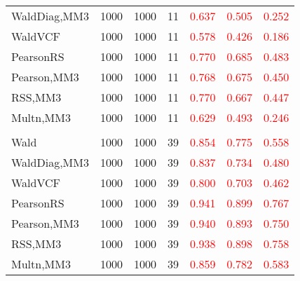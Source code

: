 \documentclass[
]{article}
\begin{document}
\begin{table}[H]
{\begin{tabular}[t]{lrrrrrr}
\hspace{1em}WaldDiag,MM3 & 1000 & 1000 & 11 & \textcolor{red}{0.637} & \textcolor{red}{0.505} & \textcolor{red}{0.252}\\
\hspace{1em}WaldVCF & 1000 & 1000 & 11 & \textcolor{red}{0.578} & \textcolor{red}{0.426} & \textcolor{red}{0.186}\\
\hspace{1em}PearsonRS & 1000 & 1000 & 11 & \textcolor{red}{0.770} & \textcolor{red}{0.685} & \textcolor{red}{0.483}\\
\hspace{1em}Pearson,MM3 & 1000 & 1000 & 11 & \textcolor{red}{0.768} & \textcolor{red}{0.675} & \textcolor{red}{0.450}\\
\hspace{1em}RSS,MM3 & 1000 & 1000 & 11 & \textcolor{red}{0.770} & \textcolor{red}{0.667} & \textcolor{red}{0.447}\\
\hspace{1em}Multn,MM3 & 1000 & 1000 & 11 & \textcolor{red}{0.629} & \textcolor{red}{0.493} & \textcolor{red}{0.246}\\
\addlinespace[0.3em]
\multicolumn{7}{l}{\textbf{3F 15V}}\\
\hspace{1em}Wald & 1000 & 1000 & 39 & \textcolor{red}{0.854} & \textcolor{red}{0.775} & \textcolor{red}{0.558}\\
\hspace{1em}WaldDiag,MM3 & 1000 & 1000 & 39 & \textcolor{red}{0.837} & \textcolor{red}{0.734} & \textcolor{red}{0.480}\\
\hspace{1em}WaldVCF & 1000 & 1000 & 39 & \textcolor{red}{0.800} & \textcolor{red}{0.703} & \textcolor{red}{0.462}\\
\hspace{1em}PearsonRS & 1000 & 1000 & 39 & \textcolor{red}{0.941} & \textcolor{red}{0.899} & \textcolor{red}{0.767}\\
\hspace{1em}Pearson,MM3 & 1000 & 1000 & 39 & \textcolor{red}{0.940} & \textcolor{red}{0.893} & \textcolor{red}{0.750}\\
\hspace{1em}RSS,MM3 & 1000 & 1000 & 39 & \textcolor{red}{0.938} & \textcolor{red}{0.898} & \textcolor{red}{0.758}\\
\hspace{1em}Multn,MM3 & 1000 & 1000 & 39 & \textcolor{red}{0.859} & \textcolor{red}{0.782} & \textcolor{red}{0.583}\\
\bottomrule
\end{tabular}}
\endgroup{}
\end{table}
\end{document}
